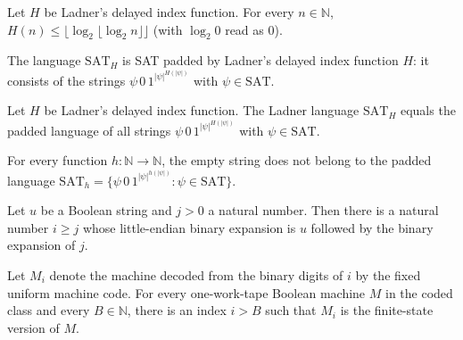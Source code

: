 \begin{theorem}
\label{Complexity.ladnerH_le}
\leanok
{}
Let $H$ be Ladner's delayed index function. For every $n\in\mathbb N$,
$H(n)\le\lfloor\log_2\lfloor\log_2 n\rfloor\rfloor$ (with $\log_2 0$ read as $0$).
\end{theorem}

\begin{definition}
\label{Complexity.SAT_H}
\leanok
{}
The language $\mathrm{SAT}_H$ is SAT padded by Ladner's delayed index function $H$: it
consists of the strings $\psi\,0\,1^{|\psi|^{H(|\psi|)}}$ with $\psi\in\mathrm{SAT}$.
\end{definition}

\begin{theorem}
\label{Complexity.SAT_H_eq}
\leanok
{}
Let $H$ be Ladner's delayed index function. The Ladner language $\mathrm{SAT}_H$ equals the
padded language of all strings $\psi\,0\,1^{|\psi|^{H(|\psi|)}}$ with $\psi\in\mathrm{SAT}$.
\end{theorem}

\begin{theorem}
\label{Complexity.ladner_pad_nil}
\leanok
{}
For every function $h:\mathbb N\to\mathbb N$, the empty string does not belong to the padded
language $\mathrm{SAT}_h=\{\psi\,0\,1^{|\psi|^{h(|\psi|)}}:\psi\in\mathrm{SAT}\}$.
\end{theorem}

\begin{theorem}
\label{Complexity.ladner_bits_prepend}
\leanok
{}
Let $u$ be a Boolean string and $j>0$ a natural number. Then there is a natural number
$i\ge j$ whose little-endian binary expansion is $u$ followed by the binary expansion of $j$.
\end{theorem}

\begin{theorem}
\label{Complexity.ladner_padded_index}
\leanok
{}
Let $M_i$ denote the machine decoded from the binary digits of $i$ by the fixed uniform
machine code. For every one-work-tape Boolean machine $M$ in the coded class and every
$B\in\mathbb N$, there is an index $i>B$ such that $M_i$ is the finite-state version of $M$.
\end{theorem}

